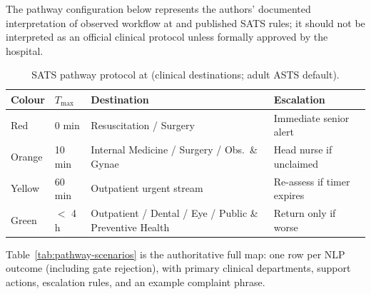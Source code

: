 The pathway configuration below represents the authors' documented interpretation of observed workflow at \examplehospital{} and published SATS rules; it should not be interpreted as an official clinical protocol unless formally approved by the hospital.

\begin{table}[H]
\centering
\small
\begin{tabular}{|l|l|p{3.2cm}|p{3.5cm}|}
\hline
\textbf{Colour} & \(T_{\max}\) & \textbf{Destination} & \textbf{Escalation} \\
\hline
Red & 0 min & Resuscitation / Surgery & Immediate senior alert \\
Orange & 10 min & Internal Medicine / Surgery / Obs.\ \& Gynae & Head nurse if unclaimed \\
Yellow & 60 min & Outpatient urgent stream & Re-assess if timer expires \\
Green & \(<\) 4 h & Outpatient / Dental / Eye / Public \& Preventive Health & Return only if worse \\
\hline
\end{tabular}
\caption{SATS pathway protocol at \examplehospital{} (clinical destinations; adult ASTS default).}
\label{tab:pathways}
\end{table}

Table~\ref{tab:pathway-scenarios} is the authoritative full map: one row per NLP outcome (including gate rejection), with primary clinical departments, support actions, escalation rules, and an example complaint phrase.


